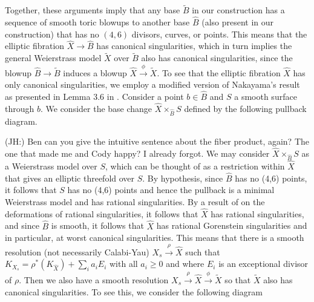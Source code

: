 \documentclass[aps,prl,twocolumn, superscriptaddress,groupedaddress,nofootinbib]{revtex4}
\newcommand{\jh}[1]{{\color{red}(JH:) #1}}
\begin{document}
\vspace{.5cm}
Together, these arguments imply that any base $\tilde B$ in our construction has a sequence of smooth toric blowups to another base $\hat B$ (also present in our construction) that has no $(4,6)$ divisors, curves, or points. This means that the elliptic fibration $\hat X \to \hat B$ has canonical singularities, which in turn implies the general Weierstrass model $\tilde X$ over $\tilde B$ also has canonical singularities, since the blowup $\hat B \to \tilde B$ induces a blowup $\hat X\xrightarrow{\phi} \tilde X$. To see that the elliptic fibration $\hat{X}$ has only canonical singularities, we employ a modified version of Nakayama's result as presented in Lemma 3.6 in \cite{Nakayama}. Consider a point $b\in \hat{B}$ and $S$ a smooth surface through $b$. We consider the base change $\hat{X} \times_{\hat{B}} S$ defined by the following pullback diagram.
\begin{center}
\end{center}
\jh{Ben can you give the intuitive sentence about the fiber product, again? The one that made
me and Cody happy? I already forgot.}
We may consider $\hat{X} \times_{\hat{B}} S$ as a Weierstrass model over $S$, which can be thought
of as a restriction within $\hat X$ that gives an elliptic threefold over $S$. By hypothesis, since $\hat{B}$ has no (4,6) points, it follows that $S$ has no (4,6) points and hence the pullback is a minimal Weierstrass model and has rational singularities. By a result of \cite{DefRatSings} on the deformations of rational singularities, it follows that $\hat{X}$ has rational singularities, and since $\hat{B}$ is smooth, it follows that $\hat{X}$ has rational Gorenstein singularities and in particular, at worst canonical singularities. This means that there is a smooth resolution
(not necessarily Calabi-Yau) $X_{s}\xrightarrow{\rho} \hat X$ such that $K_{X_s}=\rho^*(K_{\hat X})+\sum_i a_i E_i$ with all $a_i\geq 0$ and where $E_i$ is an exceptional divisor of $\rho$. Then
we also have a smooth resolution $X_s\xrightarrow{\rho} \hat X\xrightarrow{\phi}\tilde X$ so
that $\tilde X$ also has canonical singularities. To see this, we consider the following diagram 
\begin{center}
\end{center}
\end{document}
